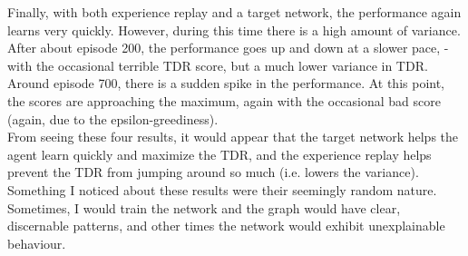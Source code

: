 \documentclass{article}
\begin{document}
  \noindent
  Finally, with both experience replay and a target network, the performance again learns very quickly. However, during
  this time there is a high amount of variance. After about episode 200, the performance goes up and down at a slower pace,
  - with the occasional terrible TDR score, but a much lower variance in TDR. Around episode 700, there is a sudden spike in the performance. At
  this point, the scores are approaching the maximum, again with the occasional bad score (again, due to the epsilon-greediness). \\

  \noindent
  From seeing these four results, it would appear that the target network helps the agent learn quickly and maximize the
  TDR, and the experience replay helps prevent the TDR from jumping around so much (i.e. lowers the variance). \\

  \noindent
  Something I noticed about these results were their seemingly random nature. Sometimes, I would train the network and
  the graph would have clear, discernable patterns, and other times the network would exhibit unexplainable behaviour.
\end{document}
